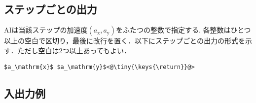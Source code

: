 \documentclass[11pt]{jarticle}
\begin{document}
\subsection{ステップごとの出力}\label{sec:output_step}
AIは当該ステップの加速度$(a_\mathrm{x},a_\mathrm{y})$をふたつの整数で指定する.
各整数はひとつ以上の空白で区切り，最後に改行を置く．以下にステップごとの出力の形式を示す．ただし空白は2つ以上あってもよい．

\begin{lstlisting}
$a_\mathrm{x}$ $a_\mathrm{y}$<@\tiny{\keys{\return}}@>
\end{lstlisting}

\subsection{入出力例}
\end{document}
